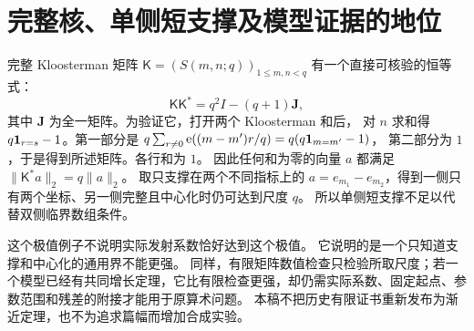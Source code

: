 \section{完整核、单侧短支撑及模型证据的地位}
完整 Kloosterman 矩阵 $\mathsf K=(S(m,n;q))_{1\le m,n<q}$ 有一个直接可核验的恒等式：
\[
\mathsf K\mathsf K^*=q^2I-(q+1)\mathbf J,
\]
其中 $\mathbf J$ 为全一矩阵。为验证它，打开两个 Kloosterman 和后，
对 $n$ 求和得 $q\mathbf 1_{r=s}-1$。第一部分是
$q\sum_{r\ne0}\mathrm e((m-m')r/q)=q(q\mathbf 1_{m=m'}-1)$，
第二部分为 $1$，于是得到所述矩阵。各行和为 $1$。
因此任何和为零的向量 $a$ 都满足 $\|\mathsf K^*a\|_2=q\|a\|_2$。
取只支撑在两个不同指标上的 $a=e_{m_1}-e_{m_2}$，得到一侧只有两个坐标、另一侧完整且中心化时仍可达到尺度 $q$。
所以单侧短支撑不足以代替双侧临界数组条件。

这个极值例子不说明实际发射系数恰好达到这个极值。
它说明的是一个只知道支撑和中心化的通用界不能更强。
同样，有限矩阵数值检查只检验所取尺度；若一个模型已经有共同增长定理，它比有限检查更强，却仍需实际系数、固定起点、参数范围和残差的附接才能用于原算术问题。
本稿不把历史有限证书重新发布为渐近定理，也不为追求篇幅而增加合成实验。
